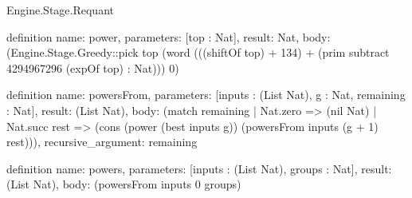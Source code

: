 \begin{lexlean}{Engine.Stage.Requant}
\begin{semanticmodule}
definition{
  name: power,
  parameters: [top : Nat],
  result: Nat,
  body: (Engine.Stage.Greedy::pick top (word (((shiftOf top) + 134) + (prim subtract 4294967296 (expOf top) : Nat))) 0)
}

definition{
  name: powersFrom,
  parameters: [inputs : (List Nat), g : Nat, remaining : Nat],
  result: (List Nat),
  body: (match remaining
    | Nat.zero => (nil Nat)
    | Nat.succ rest => (cons (power (best inputs g)) (powersFrom inputs (g + 1) rest))),
  recursive_argument: remaining
}

definition{
  name: powers,
  parameters: [inputs : (List Nat), groups : Nat],
  result: (List Nat),
  body: (powersFrom inputs 0 groups)
}
\end{semanticmodule}
\end{lexlean}
